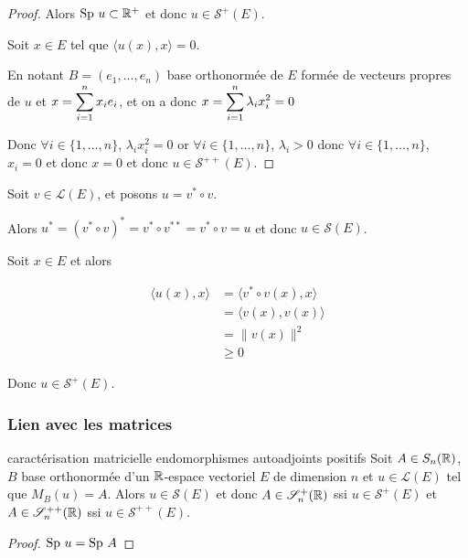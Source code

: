 \begin{proof}
    Alors $\operatorname{Sp} \, u \subset \mathbb{R}^+$ et donc $u \in \mathscr S^+(E)$.

    Soit $x \in E$ tel que $\langle u(x), x \rangle = 0$.

    En notant $B = (e_1, \dots, e_n)$ base orthonormée de $E$ formée de vecteurs propres de $u$
    et $x = \displaystyle \sum_{i = 1}^{n} x_i e_i$, et on a donc $x = \displaystyle \sum_{i = 1}^{n} \lambda_i x_i^2 = 0$

    Donc $\forall i \in \{1, \dots, n\}$, $\lambda_i x_i^2 = 0$ or 
    $\forall i \in \{1, \dots, n\}$, $\lambda_i > 0$ donc $\forall i \in \{1, \dots, n\}$, $x_i = 0$ et donc $x = 0$
    et donc $u \in \mathscr S^{++}(E)$.
\end{proof}


\begin{exemple}
    Soit $v \in \mathscr L(E)$, et posons $u = v^* \circ v$. 

    Alors $u^* = (v^* \circ v)^* = v^* \circ v^{**} = v^* \circ v = u$ et donc $u \in \mathscr S(E)$.


    Soit $x \in E$ et alors 

    \begin{align}
        \langle u(x), x \rangle & = \langle v^* \circ v (x), x \rangle \\
        & = \langle v(x), v(x) \rangle \\
        & = \| v(x) \|^2 \\
        & \geqslant 0
    \end{align}

    Donc $u \in \mathscr S^+(E)$. 
\end{exemple}

\subsubsection{Lien avec les matrices}

\begin{propositionnt}{caractérisation matricielle endomorphismes autoadjoints positifs}{}
    Soit $A \in S_n(\mathbb{R})$, $B$ base orthonormée d'un $\mathbb{R}$-espace vectoriel $E$ de dimension 
    $n$ et $u \in \mathscr L(E)$ tel que $M_B(u) = A$. 
    Alors $u \in \mathscr S(E)$ et donc $A \in \mathscr S_n^+(\mathbb{R})$ ssi $u \in \mathscr S^+(E)$ et $A \in \mathscr S_n^{++}(\mathbb{R})$ ssi $u \in \mathscr S^{++}(E)$.
\end{propositionnt}

\begin{proof}
    $\operatorname{Sp} \, u = \operatorname{Sp} \, A$ 
\end{proof}

